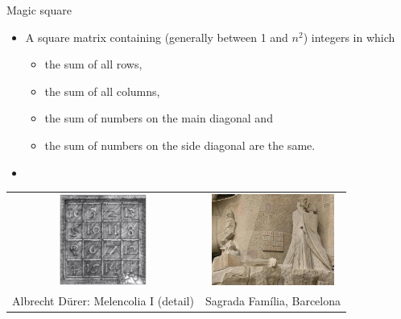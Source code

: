 \documentclass[usenames,dvipsnames,aspectratio=169]{beamer}
\begin{document}
\begin{frame}{Magic square}
  \begin{itemize}
    \item A square matrix containing (generally between 1 and $n^2$) integers in which
    \begin{itemize}
      \item the sum of all rows,
      \item the sum of all columns,
      \item the sum of numbers on the main diagonal and
      \item the sum of numbers on the side diagonal are the same.
    \end{itemize}
    \item {}
  \end{itemize}
  \begin{center}
    \tiny
    \begin{tabular}{cc}
      \includegraphics[height=3cm]{melancolia.jpg} & \includegraphics[height=3cm]{sagrada.jpg} \\
      Albrecht Dürer: Melencolia I (detail) & Sagrada Família, Barcelona\\
    \end{tabular}
  \end{center}
\end{frame}
\end{document}
